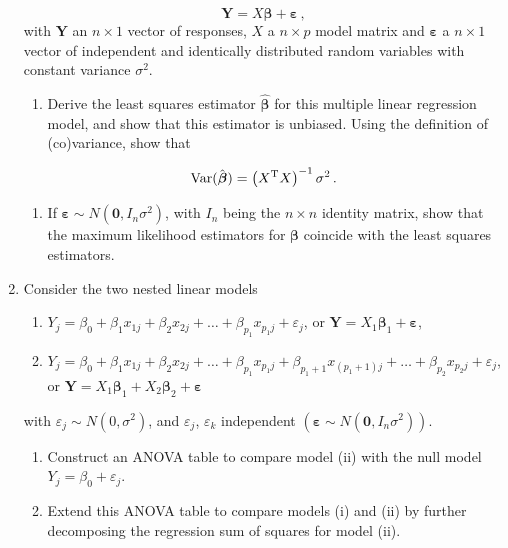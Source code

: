 \documentclass[
]{book}
\providecommand{\tightlist}{%
  \setlength{\itemsep}{0pt}\setlength{\parskip}{0pt}}
\theoremstyle{definition}
\theoremstyle{definition}
\theoremstyle{definition}
\theoremstyle{definition}
\theoremstyle{remark}
\begin{document}
\begin{enumerate}
  \[\boldsymbol{Y}= X\boldsymbol{\beta}+ \boldsymbol{\varepsilon}\,,\]
  with \(\boldsymbol{Y}\) an \(n\times 1\) vector of responses, \(X\) a \(n\times p\) model matrix and \(\boldsymbol{\varepsilon}\) a \(n\times 1\) vector of independent and identically distributed random variables with constant variance \(\sigma^2\).

  \begin{enumerate}
  \def\labelenumii{\alph{enumii}.}
  \tightlist
  \item
    Derive the least squares estimator \(\hat{\boldsymbol{\beta}}\) for this multiple linear regression model, and show that this estimator is unbiased. Using the definition of (co)variance, show that
  \end{enumerate}

  \[\mbox{Var}(\hat{\boldsymbol{\beta}}) = \left(X^{\rm{T}}X\right)^{-1}\sigma^2\,.\]

  \begin{enumerate}
  \def\labelenumii{\alph{enumii}.}
  \setcounter{enumii}{1}
  \tightlist
  \item
    If \(\boldsymbol{\varepsilon}\sim N (\boldsymbol{0},I_n\sigma^2)\), with \(I_n\) being the \(n\times n\) identity matrix, show that the maximum likelihood estimators for \(\boldsymbol{\beta}\) coincide with the least squares estimators.
  \end{enumerate}
\item
  Consider the two nested linear models

  \begin{enumerate}
  \def\labelenumii{(\roman{enumii})}
  \item
    \(Y_j = \beta_0 + \beta_1x_{1j} + \beta_2x_{2j} + \ldots + \beta_{p_1}x_{p_1j} + \varepsilon_j\), or \(\boldsymbol{Y}= X_1\boldsymbol{\beta}_1 + \boldsymbol{\varepsilon}\),
  \item
    \(Y_j = \beta_0 + \beta_1x_{1j} + \beta_2x_{2j} + \ldots + \beta_{p_1}x_{p_1j} + \beta_{p_1+1}x_{(p_1+1)j} + \ldots + \beta_{p_2}x_{p_2j} + \varepsilon_j\), or \(\boldsymbol{Y}= X_1\boldsymbol{\beta}_1 + X_2\boldsymbol{\beta}_2+ \boldsymbol{\varepsilon}\)
  \end{enumerate}

  with \(\varepsilon_j\sim N(0, \sigma^2)\), and \(\varepsilon_{j}\), \(\varepsilon_{k}\) independent \((\boldsymbol{\varepsilon}\sim N(\boldsymbol{0},I_n\sigma^2))\).

  \begin{enumerate}
  \def\labelenumii{\alph{enumii}.}
  \item
    Construct an ANOVA table to compare model (ii) with the null model \(Y_j=\beta_0 + \varepsilon_j\).
  \item
    Extend this ANOVA table to compare models (i) and (ii) by further decomposing the regression sum of squares for model (ii).
  \end{enumerate}


\end{enumerate}
\end{document}
